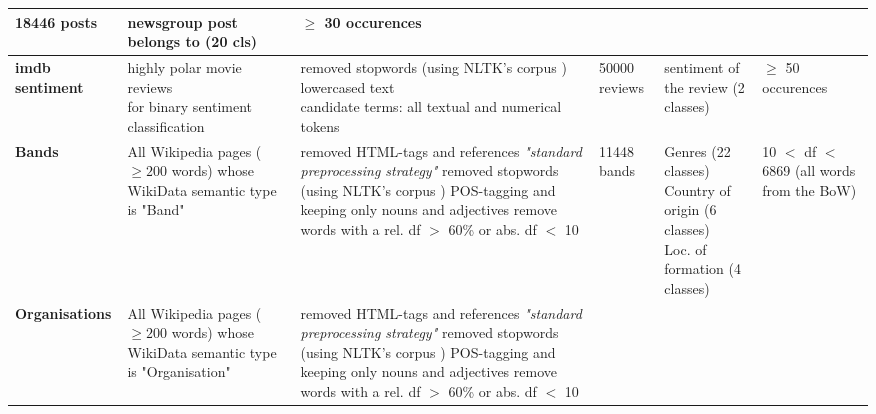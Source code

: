 \begin{landscape}
\begin{table}[]
{\begin{tabular}{@{}llllll@{}}
        		18446 posts &
        		\tabitem newsgroup post belongs to (20 cls) &
        		$\geq$ 30 occurences 
        		\\ \midrule
        	\textbf{imdb sentiment\tablefootnote{\url{http://ai.stanford.edu/~amaas/data/sentiment/} \cite{Maas2011}} \cite{Ager2018}} &
				\specialcell[l]{highly polar movie reviews\\for binary sentiment classification}  &
        		\specialcell[l]{ \tabitem removed stopwords (using NLTK's corpus \cite{loper-bird-2002-nltk})\\ \tabitem lowercased text\\ \tabitem candidate terms: all textual and numerical tokens} &
        		50000 reviews &
        		\tabitem sentiment of the review (2 classes) &
        		$\geq$ 50 occurences
        		\\ \midrule
        	\textbf{Bands \cite{Alshaikh2020}} &
        		\specialcell[l]{All Wikipedia pages ($\geq 200$ words) whose \\ WikiData semantic type is "Band"} &
        		\specialcell[l]{ \tabitem removed HTML-tags and references \\ \tabitem \textit{"standard preprocessing strategy"} \cite[137]{Alshaikh2019} \\ \tabitem removed stopwords (using NLTK's corpus \cite{loper-bird-2002-nltk})\\ \tabitem POS-tagging and keeping only nouns and adjectives \\ \tabitem remove words with a rel. \acrshort{df}  $>$ 60\% or abs. \acrshort{df} $<$ 10 } &
        		11448 bands & \specialcell[l]{ \tabitem Genres (22 classes) \\ \tabitem Country of origin (6 classes) \\ \tabitem Loc. of formation (4 classes) }  & 
        		\specialcell[l]{ 10 $<$ \acrshort{df} $<$ 6869 \\ (all words from the BoW)}\\ \midrule
        	\textbf{Organisations\tablefootnote{\label{fnote:for_alshaikh2019}Originally created in and for \cite{Alshaikh2019}} \cite{Alshaikh2020}} &
        		\specialcell[l]{All Wikipedia pages ($\geq 200$ words) whose \\ WikiData semantic type is "Organisation"} &
        		\specialcell[l]{ \tabitem removed HTML-tags and references \\ \tabitem \textit{"standard preprocessing strategy"} \cite[137]{Alshaikh2019} \\ \tabitem removed stopwords (using NLTK's corpus \cite{loper-bird-2002-nltk})\\ \tabitem POS-tagging and keeping only nouns and adjectives \\ \tabitem remove words with a rel. \acrshort{df}  $>$ 60\% or abs. \acrshort{df} $<$ 10 } &

\end{tabular}}
\end{table}
\end{landscape}
